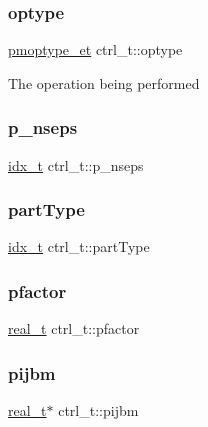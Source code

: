 \subsubsection{\texorpdfstring{optype}{optype}\hspace{0.1cm}{\footnotesize\ttfamily [2/2]}}
{\footnotesize\ttfamily \hyperlink{a00840_a8f61c0f0e4ba81b0e3b6901026acb936}{pmoptype\+\_\+et} ctrl\+\_\+t\+::optype}

The operation being performed \mbox{\label{a00742_af9239c530aff4bae41ce44a2f73bb814}} 
\subsubsection{\texorpdfstring{p\+\_\+nseps}{p\_nseps}}
{\footnotesize\ttfamily \hyperlink{a00876_aaa5262be3e700770163401acb0150f52}{idx\+\_\+t} ctrl\+\_\+t\+::p\+\_\+nseps}

\mbox{\label{a00742_afadeadc5b9dbc27c580f0bddcdb15b9a}} 
\subsubsection{\texorpdfstring{part\+Type}{partType}}
{\footnotesize\ttfamily \hyperlink{a00876_aaa5262be3e700770163401acb0150f52}{idx\+\_\+t} ctrl\+\_\+t\+::part\+Type}

\mbox{\label{a00742_a3322c07da4ca861a3fe47dc934510e24}} 
\subsubsection{\texorpdfstring{pfactor}{pfactor}}
{\footnotesize\ttfamily \hyperlink{a00876_a1924a4f6907cc3833213aba1f07fcbe9}{real\+\_\+t} ctrl\+\_\+t\+::pfactor}

\mbox{\label{a00742_ae347c6497954a20166af15a2ddd4e286}} 
\subsubsection{\texorpdfstring{pijbm}{pijbm}}
{\footnotesize\ttfamily \hyperlink{a00876_a1924a4f6907cc3833213aba1f07fcbe9}{real\+\_\+t}$\ast$ ctrl\+\_\+t\+::pijbm}

